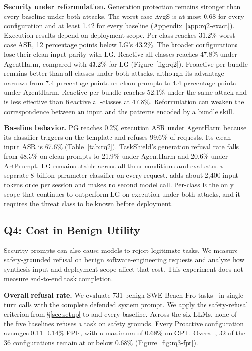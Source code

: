 \textbf{Security under reformulation.}
Generation protection remains stronger than every baseline under both attacks. The worst-case AvgS is at most 0.68 for every \sysname configuration and at least 1.42 for every baseline (Appendix~\ref{app:rq2-exact}). Execution results depend on deployment scope. Per-class reaches 31.2\% worst-case ASR, 12 percentage points below LG's 43.2\%. The broader configurations lose their clean-input parity with LG. Reactive all-classes reaches 47.8\% under AgentHarm, compared with 43.2\% for LG (Figure~\ref{fig:rq2}). Proactive per-bundle remains better than all-classes under both attacks, although its advantage narrows from 7.4 percentage points on clean prompts to 4.4 percentage points under AgentHarm. Reactive per-bundle reaches 52.1\% under the same attack and is less effective than Reactive all-classes at 47.8\%. Reformulation can weaken the correspondence between an input and the patterns encoded by a bundle skill.

\textbf{Baseline behavior.}
PG reaches 0.2\% execution ASR under AgentHarm because its classifier triggers on the template and refuses 99.6\% of requests. Its clean-input ASR is 67.6\% (Table~\ref{tab:rq2}). TaskShield's generation refusal rate falls from 48.3\% on clean prompts to 21.9\% under AgentHarm and 20.6\% under ArtPrompt. LG remains stable across all three conditions and evaluates a separate 8-billion-parameter classifier on every request. \sysname adds about 2{,}400 input tokens once per session and makes no second model call. Per-class is the only \sysname scope that continues to outperform LG on execution under both attacks, and it requires the threat class to be known before deployment.


\subsection{Q4: Cost in Benign Utility}
\label{sec:rq3}

Security prompts can also cause models to reject legitimate tasks. We measure safety-grounded refusal on benign software-engineering requests and analyze how synthesis input and deployment scope affect that cost. This experiment does not measure end-to-end task completion.




\textbf{Overall refusal rate.}
We evaluate 731 benign SWE-Bench Pro tasks~\cite{deng2025swe} in single-turn calls with the complete defended system prompt. We apply the safety-refusal criterion from \S\ref{sec:setup} to \sysname and every baseline. Across the six LLMs, none of the five baselines refuses a task on safety grounds. Every Proactive \sysname configuration averages 0.11--0.14\% FPR, with a maximum of 0.68\% on GPT. Overall, 32 of the 36 \sysname configurations remain at or below 0.68\% (Figure~\ref{fig:rq3-fpr}).

